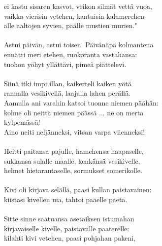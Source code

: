 ei kastu sisaren kasvot, veikon silmät vettä vuoa,             \\
vaikka vierisin vetehen, kaatuisin kalamerehen                 \\
alle aaltojen syvien, päälle mustien murien."                  \\
                                                               \\
Astui päivän, astui toisen. Päivänäpä kolmantena               \\
ennätti meri etehen, ruokoranta vastahansa:                    \\
tuohon yöhyt yllättävi, pimeä piättelevi.                      \\
                                                               \\
Siinä itki impi illan, kaikerteli kaiken yötä                  \\
rannalla vesikivellä, laajalla lahen perällä.                  \\
Aamulla ani varahin katsoi tuonne niemen päähän:               \\
kolme oli neittä niemen päässä ... ne on merta                 \\
kylpemässä!                                                    \\
Aino neiti neljänneksi, vitsan varpa viienneksi!               \\
                                                               \\
Heitti paitansa pajulle, hamehensa haapaselle,                 \\
sukkansa sulalle maalle, kenkänsä vesikivelle,                 \\
helmet hietarantaselle, sormukset somerikolle.                 \\
                                                               \\
Kivi oli kirjava selällä, paasi kullan paistavainen:           \\
kiistasi kivellen uia, tahtoi paaelle paeta.                   \\
                                                               \\
Sitte sinne saatuansa asetaiksen istumahan                     \\
kirjavaiselle kivelle, paistavalle paaterelle:                 \\
kilahti kivi vetehen, paasi pohjahan pakeni,                   \\
